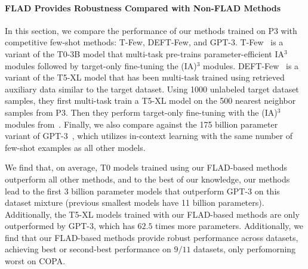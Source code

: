 \paragraph{FLAD Provides Robustness Compared with Non-FLAD Methods}
In this section, we compare the performance of our methods trained on P3 with competitive few-shot methods: T-Few, DEFT-Few, and GPT-3.
T-Few~\citep{liu2020tfew} is a variant of the T0-3B model that multi-task pre-trains parameter-efficient IA$^{3}$ modules followed by target-only fine-tuning the (IA)$^{3}$ modules.
DEFT-Few~\citep{Ivison2022DEFT} is a variant of the T5-XL model that has been multi-task trained using retrieved auxiliary data similar to the target dataset. Using 1000 unlabeled target dataset samples, they first multi-task train a T5-XL model on the 500 nearest neighbor samples from P3. Then they perform target-only fine-tuning with the (IA)$^{3}$ modules from~\citet{liu2020tfew}.
Finally, we also compare against the 175 billion parameter variant of GPT-3~\citep{NEURIPS2020_1457c0d6}, which utilizes in-context learning with the same number of few-shot examples as all other models.

We find that, on average, T0 models trained using our FLAD-based methods outperform all other methods, and to the best of our knowledge, our methods lead to the first 3 billion parameter models that outperform GPT-3 on this dataset mixture (previous smallest models have 11 billion parameters). Additionally, the T5-XL models trained with our FLAD-based methods are only outperformed by GPT-3, which has $62.5$ times more parameters.
Additionally, we find that our FLAD-based methods provide robust performance across datasets, achieving best or second-best performance on $9/11$ datasets, only perfomorning worst on COPA.